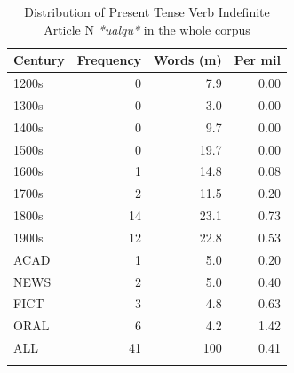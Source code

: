 \begin{table}

\begin{tabular}{lrrr}
\lsptoprule
Century &  Frequency &  Words (m) &  Per mil\\
\midrule
1200s& 0& 7.9& 0.00\\
1300s& 0& 3.0& 0.00\\
1400s& 0& 9.7& 0.00\\
1500s& 0& 19.7& 0.00\\
1600s& 1& 14.8& 0.08\\
1700s& 2& 11.5& 0.20\\
1800s& 14& 23.1& 0.73\\
1900s& 12& 22.8& 0.53\\
ACAD& 1& 5.0& 0.20\\
NEWS& 2& 5.0& 0.40\\
FICT& 3& 4.8& 0.63\\
ORAL & 6    & 4.2  & 1.42 \\
\midrule
ALL& 41& 100& 0.41\\
\lspbottomrule
\end{tabular}
\caption{Distribution of Present Tense Verb Indefinite Article N \textit{*ualqu*} in the whole corpus}
\label{tab:extracted9}
\end{table}


